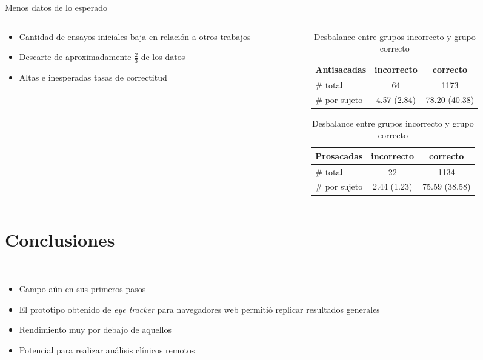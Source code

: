 \documentclass[aspectratio=169]{beamer}
\begin{document}
\begin{frame}{Menos datos de lo esperado}
  \begin{columns}
    \begin{column}{0.4\textwidth}
      \begin{itemize}
        \item Cantidad de ensayos iniciales baja en relación a otros trabajos
        \item Descarte de aproximadamente $\frac{2}{3}$ de los datos
        \item Altas e inesperadas tasas de correctitud
      \end{itemize}
    \end{column}

    \begin{column}{0.6\textwidth}
      \begin{table}
        \centering

        \begin{tabular}{ l | c | c }
          Antisacadas   & incorrecto  & correcto \\
          \hline
          \# total      & 64          & 1173 \\
          \hline
          \# por sujeto & 4.57 (2.84) & 78.20 (40.38)
        \end{tabular}

        \vspace{0.3cm}

        \begin{tabular}{ l | c | c }
          Prosacadas    & incorrecto  & correcto \\
          \hline
          \# total      & 22          & 1134 \\
          \hline
          \# por sujeto & 2.44 (1.23) & 75.59 (38.58)
        \end{tabular}

        \caption{Desbalance entre grupos incorrecto y grupo correcto}
      \end{table}
    \end{column}
  \end{columns}
\end{frame}

\section{Conclusiones}

\begin{frame}{~}
  \begin{itemize}
    \item Campo aún en sus primeros pasos
    \item El prototipo obtenido de \textit{eye tracker} para navegadores web
      permitió replicar resultados generales
    \item Rendimiento muy por debajo de aquellos
    \item Potencial para realizar análisis clínicos remotos
  \end{itemize}
\end{frame}
\end{document}
